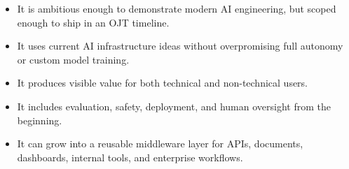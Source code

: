 \begin{itemize}
  \item It is ambitious enough to demonstrate modern AI engineering, but scoped enough to ship in an OJT timeline.
  \item It uses current AI infrastructure ideas without overpromising full autonomy or custom model training.
  \item It produces visible value for both technical and non-technical users.
  \item It includes evaluation, safety, deployment, and human oversight from the beginning.
  \item It can grow into a reusable middleware layer for APIs, documents, dashboards, internal tools, and enterprise workflows.
\end{itemize}
